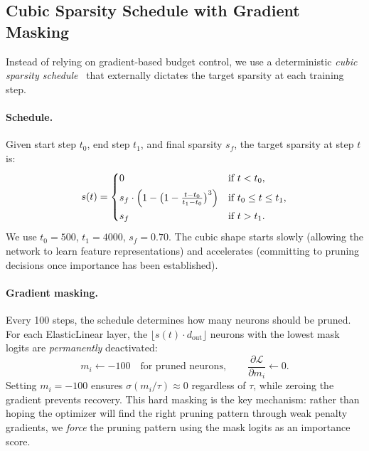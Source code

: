 \subsection{Cubic Sparsity Schedule with Gradient Masking}
\label{sec:schedule}

Instead of relying on gradient-based budget control, we use a deterministic \emph{cubic sparsity schedule}~\citep{zhu2017prune} that externally dictates the target sparsity at each training step.

\paragraph{Schedule.} Given start step $t_0$, end step $t_1$, and final sparsity $s_f$, the target sparsity at step $t$ is:
\begin{equation}
\label{eq:cubic}
s(t) = \begin{cases}
0 & \text{if } t < t_0, \\[4pt]
s_f \cdot \Bigl(1 - \bigl(1 - \tfrac{t - t_0}{t_1 - t_0}\bigr)^3\Bigr) & \text{if } t_0 \leq t \leq t_1, \\[4pt]
s_f & \text{if } t > t_1.
\end{cases}
\end{equation}
We use $t_0 {=} 500$, $t_1 {=} 4000$, $s_f {=} 0.70$. The cubic shape starts slowly (allowing the network to learn feature representations) and accelerates (committing to pruning decisions once importance has been established).

\paragraph{Gradient masking.} Every 100 steps, the schedule determines how many neurons should be pruned. For each ElasticLinear layer, the $\lfloor s(t) \cdot d_{\text{out}} \rfloor$ neurons with the lowest mask logits are \emph{permanently} deactivated:
\begin{equation}
m_i \leftarrow -100 \quad \text{for pruned neurons}, \qquad \frac{\partial \mathcal{L}}{\partial m_i} \leftarrow 0.
\end{equation}
Setting $m_i = -100$ ensures $\sigma(m_i / \tau) \approx 0$ regardless of $\tau$, while zeroing the gradient prevents recovery. This hard masking is the key mechanism: rather than hoping the optimizer will find the right pruning pattern through weak penalty gradients, we \emph{force} the pruning pattern using the mask logits as an importance score.

